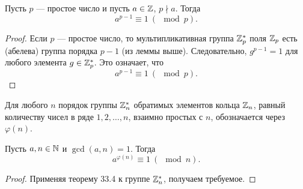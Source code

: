 \begin{theorem}
    Пусть $p$ --- простое число и пусть $a \in \mathbb{Z}$, $p \nmid a$. Тогда
    $$
    a^{p - 1} \equiv 1\ (\mod p).
    $$
\end{theorem}

\begin{proof}
    Если $p$ --- простое число, то мультипликативная группа $\mathbb{Z}_p^\ast$ поля $\mathbb{Z}_p$ есть (абелева) группа порядка $p - 1$ (из леммы выше). Следовательно, $g^{p - 1} = 1$ для любого элемента $g \in \mathbb{Z}_p^\ast$. Это означает, что
    $$
    a^{p - 1} \equiv 1\ (\mod p).
    $$
\end{proof}

\begin{definition}
    Для любого $n$ порядок группы $\mathbb{Z}_n^\ast$ обратимых элементов кольца $\mathbb{Z}_n$, равный количеству чисел в ряде $1, 2, \ldots, n$, взаимно простых с $n$, обозначается через $\varphi(n)$.
\end{definition}

\begin{theorem}[Эйлер]
    Пусть $a, n \in \mathbb{N}$ и $\gcd(a, n) = 1$. Тогда
    $$
    a^{\varphi(n)} \equiv 1\ (\mod n).
    $$
\end{theorem}

\begin{proof}
    Применяя теорему 33.4 к группе $\mathbb{Z}_n^\ast$, получаем требуемое.
\end{proof}


